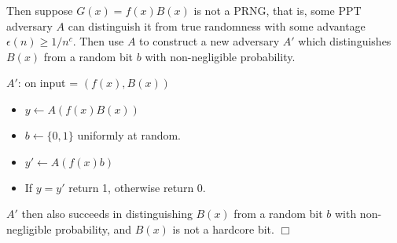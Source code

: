 \documentclass[12pt]{article}
\begin{document}
Then suppose $G(x) = f(x)B(x)$ is not a PRNG, that is, some PPT adversary $A$
can distinguish it from true randomness with some advantage
$\epsilon(n) \ge 1/n^c$.
Then use $A$ to construct a new adversary $A'$ which  distinguishes
$B(x)$ from a random bit $b$ with non-negligible probability.

$A'$: on input = $(f(x), B(x))$

\begin{itemize}
\item $y \gets A(f(x)B(x))$
\item $b \gets \{0,1\}$ uniformly at random.
\item $y' \gets A(f(x)b)$
\item If $y=y'$ return 1, otherwise return 0.
\end{itemize}

$A'$ then also succeeds in distinguishing $B(x)$ from a random bit $b$ with
non-negligible probability, and $B(x)$ is not a hardcore bit.
$\Box$
\end{document}
